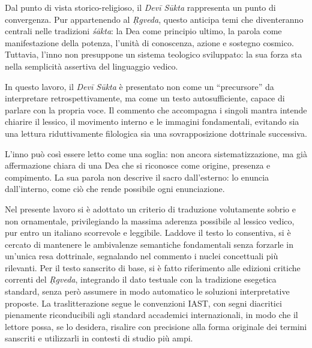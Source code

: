 Dal punto di vista storico-religioso, il \textit{Devī Sūkta} rappresenta un punto di convergenza. Pur appartenendo al \textit{Ṛgveda}, questo anticipa temi che diventeranno centrali nelle tradizioni \textit{śākta}: la Dea come principio ultimo, la parola come manifestazione della potenza, l’unità di conoscenza, azione e sostegno cosmico. Tuttavia, l’inno non presuppone un sistema teologico sviluppato: la sua forza sta nella semplicità assertiva del linguaggio vedico.

In questo lavoro, il \textit{Devī Sūkta} è presentato non come un “precursore” da interpretare retrospettivamente, ma come un testo autosufficiente, capace di parlare con la propria voce. Il commento che accompagna i singoli mantra intende chiarire il lessico, il movimento interno e le immagini fondamentali, evitando sia una lettura riduttivamente filologica sia una sovrapposizione dottrinale successiva.

L’inno può così essere letto come una soglia: non ancora sistematizzazione, ma già affermazione chiara di una Dea che si riconosce come origine, presenza e compimento. La sua parola non descrive il sacro dall’esterno: lo enuncia dall’interno, come ciò che rende possibile ogni enunciazione.

Nel presente lavoro si è adottato un criterio di traduzione volutamente sobrio e non ornamentale, privilegiando la massima aderenza possibile al lessico vedico, pur entro un italiano scorrevole e leggibile. Laddove il testo lo consentiva, si è cercato di mantenere le ambivalenze semantiche fondamentali senza forzarle in un’unica resa dottrinale, segnalando nel commento i nuclei concettuali più rilevanti. Per il testo sanscrito di base, si è fatto riferimento alle edizioni critiche correnti del \textit{Ṛgveda}, integrando il dato testuale con la tradizione esegetica standard, senza però assumere in modo automatico le soluzioni interpretative proposte. La traslitterazione segue le convenzioni IAST, con segni diacritici pienamente riconducibili agli standard accademici internazionali, in modo che il lettore possa, se lo desidera, risalire con precisione alla forma originale dei termini sanscriti e utilizzarli in contesti di studio più ampi.
